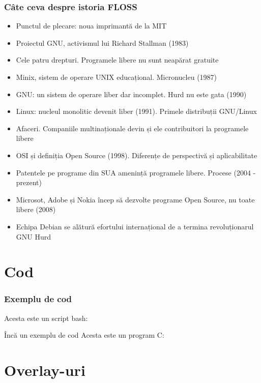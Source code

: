 \documentclass{beamer}
\begin{document}
\begin{frame}[allowframebreaks] %
\frametitle{Câte ceva despre istoria FLOSS}
\begin{itemize}
\item Punctul de plecare: noua imprimantă de la MIT
\item Proiectul GNU, activismul lui Richard Stallman (1983)
\item Cele patru drepturi. Programele libere nu sunt neapărat gratuite
\item Minix, sistem de operare UNIX educațional. Micronucleu (1987)
\item GNU: un sistem de operare liber dar incomplet. Hurd nu este gata (1990)
\item Linux: nucleul monolitic devenit liber (1991). Primele distribuții
GNU/Linux
\item Afaceri. Companiile multinaționale devin și ele contribuitori la
programele libere
\item OSI și definiția Open Source (1998). Diferențe de perspectivă și
aplicabilitate
\item Patentele pe programe din SUA amenință programele libere. Procese (2004
- prezent)
\item Microsot, Adobe și Nokia încep să dezvolte programe Open Source, nu
toate libere (2008)
\item Echipa Debian se alătură efortului internațional de a termina
revoluționarul GNU Hurd
\end{itemize}
\end{frame}

\section{Cod}
\frame{\tableofcontents[currentsection]}

\begin{frame}
\frametitle{Exemplu de cod}
Acesta este un script bash:\\
\end{frame}

\begin{frame}{Încă un exemplu de cod}
Acesta este un program C:


\end{frame}

\section{Overlay-uri}
\frame{\tableofcontents[currentsection]}
\end{document}
